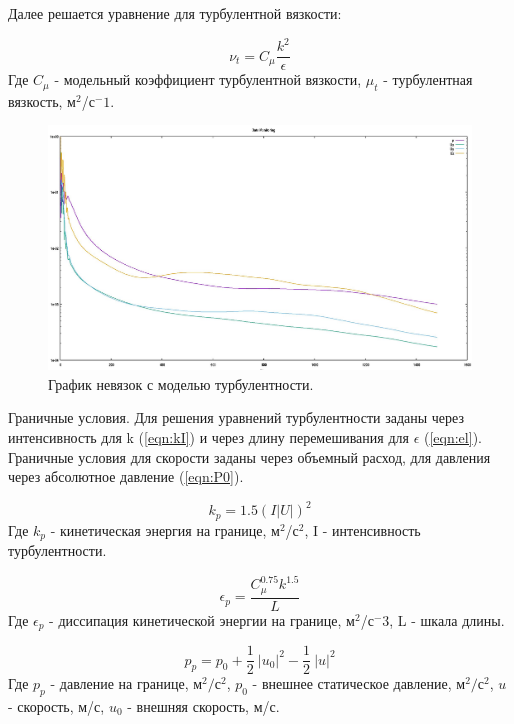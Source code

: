 \documentclass[14pt,a4paper]{article}
\begin{document}
        Далее решается уравнение для турбулентной вязкости:
        
        \begin{equation}\label{eqn:mu}
           \nu_{t} = C_{\mu}\frac{k^2}{\epsilon}
        \end{equation} 
        Где $C_{\mu}$ - модельный коэффициент турбулентной вязкости, $\mu_{t}$ - турбулентная вязкость, м$^2$/с$^-1$.
        
        \begin{figure}[H]
            \centering
            \includegraphics[width = 1\linewidth]{dataMonitoringRAS}
            \caption{График невязок с моделью турбулентности.}
            \label{fig:DRRAS}
        \end{figure}
        
        Граничные условия. Для решения уравнений турбулентности заданы через интенсивность для k (\ref{eqn:kI}) и через длину перемешивания для $\epsilon$ (\ref{eqn:el}). Граничные условия для скорости заданы через объемный расход, для давления через абсолютное давление (\ref{eqn:P0}).
        
        \begin{equation}\label{eqn:kI}
            k_{p} = 1.5 (I |U|)^2
        \end{equation}
        Где $k_{p}$ - кинетическая энергия на границе, м$^2$/с$^2$, I - интенсивность турбулентности.
        
        \begin{equation}\label{eqn:el}
            \epsilon_{p} = \frac{C_{\mu}^{0.75} k^{1.5}}{L}           
        \end{equation}
        Где $\epsilon_{p}$ - диссипация кинетической энергии на границе, м$^2$/с$^-3$, L - шкала длины.
        
        \begin{equation}\label{eqn:P0}
            p_{p} = p_{0} + \frac{1}{2}\ \left|u_{0}\right|^2 - \frac{1}{2}\ \left|u\right|^2
        \end{equation}
        Где $p_{p}$ - давление на границе, м$^{2}/$с$^{2}$, $p_{0}$ - внешнее статическое давление, м$^{2}/$с$^{2}$, $u$ - скорость, м/с, $u_{0}$ - внешняя скорость, м/с.
        
\end{document}

